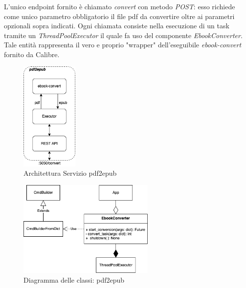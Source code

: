L'unico endpoint fornito è chiamato \textit{convert} con metodo \textit{POST}: esso richiede come unico parametro obbligatorio il file pdf da convertire oltre ai parametri opzionali sopra indicati. Ogni chiamata consiste nella esecuzione di un task tramite un \textit{ThreadPoolExecutor} il quale fa uso del componente \textit{EbookConverter}. Tale entità rappresenta il vero e proprio "wrapper" dell'eseguibile \textit{ebook-convert} fornito da Calibre.
\begin{figure}[H]
\centering
\includegraphics[width=0.25\textwidth]{img/tesi-4-pdf2epub.drawio.png}
\caption{Architettura Servizio pdf2epub}
\end{figure}
\begin{figure}[H]
\centering
\includegraphics[width=0.6\textwidth]{img/tesi-5-pdf2epub.drawio.png}
\caption{Diagramma delle classi: pdf2epub}
\end{figure}

